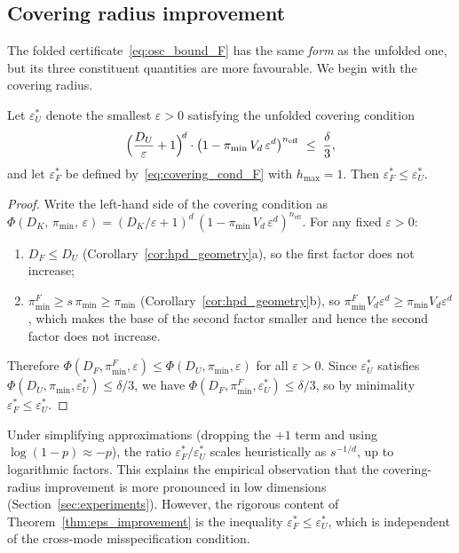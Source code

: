 \subsection{Covering radius improvement}
\label{sec:covering_improvement}

The folded certificate~\eqref{eq:osc_bound_F} has the same
\emph{form} as the unfolded one, but its three constituent
quantities are more favourable.  We begin with the covering
radius.

\begin{theorem}\label{thm:eps_improvement}
  Let $\varepsilon_U^*$ denote the smallest $\varepsilon > 0$
  satisfying the unfolded covering condition
  \begin{equation}\label{eq:covering_cond_U}
    \Bigl(\frac{D_U}{\varepsilon} + 1\Bigr)^{\!d}
    \cdot
    \bigl(1 - \pi_{\min}\, V_d\, \varepsilon^d\bigr)^{n_{\mathrm{eff}}}
    \;\leq\; \frac{\delta}{3},
  \end{equation}
  and let $\varepsilon_F^*$ be defined
  by~\eqref{eq:covering_cond_F} with $h_{\max} = 1$.  Then
  $\varepsilon_F^* \leq \varepsilon_U^*$.
\end{theorem}

\begin{proof}
  Write the left-hand side of the covering condition as
  $\Phi(D_K,\, \pi_{\min},\, \varepsilon)
  = (D_K/\varepsilon + 1)^d\,
  (1 - \pi_{\min}\, V_d\, \varepsilon^d)^{n_{\mathrm{eff}}}$.
  For any fixed $\varepsilon > 0$:
  \begin{enumerate}[nosep]
    \item $D_F \leq D_U$
    (Corollary~\ref{cor:hpd_geometry}a), so the first factor does not
    increase;
    \item $\pi_{\min}^F \geq s\,\pi_{\min} \geq \pi_{\min}$
    (Corollary~\ref{cor:hpd_geometry}b), so
    $\pi_{\min}^F V_d \varepsilon^d \geq \pi_{\min} V_d \varepsilon^d$,
    which makes the base of the second factor smaller and hence the
    second factor does not increase.
  \end{enumerate}
  Therefore $\Phi(D_F, \pi_{\min}^F, \varepsilon)
  \leq \Phi(D_U, \pi_{\min}, \varepsilon)$ for all
  $\varepsilon > 0$.
  Since $\varepsilon_U^*$ satisfies
  $\Phi(D_U, \pi_{\min}, \varepsilon_U^*) \leq \delta/3$, we have
  $\Phi(D_F, \pi_{\min}^F, \varepsilon_U^*) \leq \delta/3$, so by
  minimality $\varepsilon_F^* \leq \varepsilon_U^*$.
\end{proof}

\begin{remark}\label{rem:eps_scaling}
  Under simplifying approximations (dropping the $+1$ term and using
  $\log(1 - p) \approx -p$), the ratio
  $\varepsilon_F^* / \varepsilon_U^*$ scales heuristically as
  $s^{-1/d}$, up to logarithmic factors.  This explains the
  empirical observation that the covering-radius improvement is
  more pronounced in low dimensions
  (Section~\ref{sec:experiments}).  However, the rigorous content
  of Theorem~\ref{thm:eps_improvement} is the inequality
  $\varepsilon_F^* \leq \varepsilon_U^*$, which is independent of
  the cross-mode misspecification condition.
\end{remark}


